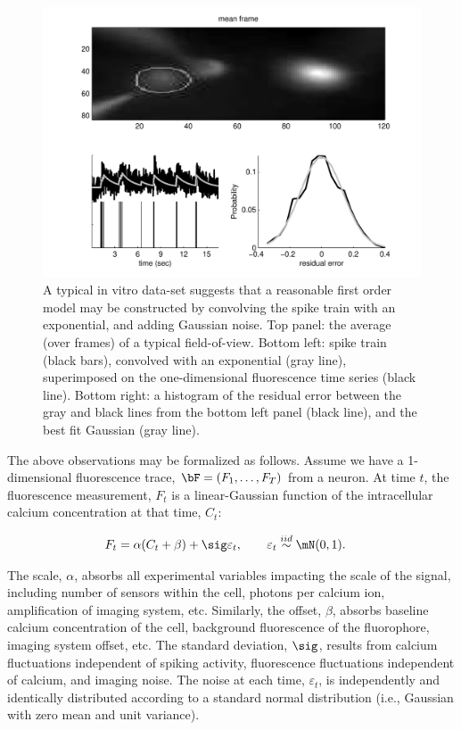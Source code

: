 \begin{figure}[h!]
\centering \includegraphics[width=.9\linewidth]{../figs/in_vitro_ex}
\caption{A typical in vitro data-set suggests that a reasonable first order model may be constructed by convolving the spike train with an exponential, and adding Gaussian noise. Top panel: the average (over frames) of a typical field-of-view.  Bottom left: spike train (black bars), convolved with an exponential (gray line), superimposed on the one-dimensional fluorescence time series (black line).  Bottom right: a histogram of the residual error between the gray and black lines from the bottom left panel (black line), and the best fit Gaussian (gray line).} \label{fig:in_vitro_ex}
\end{figure}

The above observations may be formalized as follows. Assume we have a 1-dimensional fluorescence trace, $\bF=(F_1, \ldots, F_T)$ from a neuron.  At time $t$, the fluorescence measurement, $F_t$ is a linear-Gaussian function of the intracellular calcium concentration at that time, $C_t$:

\begin{align} \label{eq:F}
F_t &= \alpha (C_t + \beta) + \sig \varepsilon_t, \qquad \varepsilon_t \overset{iid}{\sim} \mN(0,1).
\end{align}

\noindent The scale, $\alpha$, absorbs all experimental variables impacting the scale of the signal, including number of sensors within the cell, photons per calcium ion, amplification of imaging system, etc.  Similarly, the offset, $\beta$, absorbs baseline calcium concentration of the cell, background fluorescence of the fluorophore, imaging system offset, etc.  The standard deviation, $\sig$, results from calcium fluctuations independent of spiking activity, fluorescence fluctuations independent of calcium, and imaging noise. The noise at each time, $\varepsilon_t$, is independently and identically distributed according to a standard normal distribution (i.e., Gaussian with zero mean and unit variance).  %


